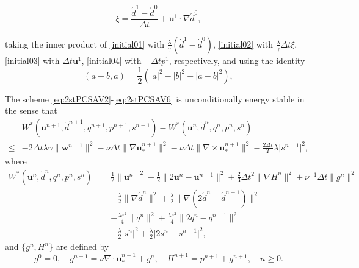 \documentclass[10pt,a4paper]{amsart}
\newcommand{\dd}{\ensuremath{\acute d}}
\newcommand{\uu}{\mathrm{\textbf{u}}}
\newcommand{\ww}{\mathrm{\textbf{w}}}
\begin{document}
\begin{equation}\label{initial02}
\xi=\frac{\dd^{1}-\dd^{0}}{\Delta t}+ \uu^{1}\cdot \nabla \dd^{0},
\end{equation}

taking the inner product of \eqref{initial01} with $\frac{\lambda}{\gamma}(\dd^{1}-\dd^0)$, \eqref{initial02} with $\frac{\lambda}{\gamma}\Delta t\xi$, \eqref{initial03} with $\Delta t\uu^1$, \eqref{initial04} with $-\Delta t p^1$, respectively, and using the identity \begin{equation}\label{a-ba}
(a-b,a)=\frac{1}{2}\left(|a|^2-|b|^2+|a-b|^2\right),
\end{equation} 

\begin{theorem}\label{pcsavthm}
The scheme \eqref{eq:2stPCSAV2}-\eqref{eq:2stPCSAV6} is unconditionally energy stable in the sense that
\begin{equation}\label{2stenergy}
\begin{aligned}
&W^*\left(\uu^{n+1},\dd^{n+1},q^{n+1},p^{n+1},s^{n+1}\right)-W^*\left(\uu^{n},\dd^{n},q^{n},p^{n},s^{n}\right)\\
\leq &-2\Delta t\lambda\gamma\lVert \ww^{n+1}\rVert^2-\nu\Delta t\lVert \nabla\uu_*^{n+1}\rVert^2
-\nu\Delta t \lVert \nabla\times\uu_*^{n+1}\rVert^2
-\frac{2\Delta t}{T}\lambda\lvert s^{n+1}\rvert^2,
\end{aligned}
\end{equation}
where
\begin{align*}
W^*\left(\uu^{n},\dd^{n},q^{n},p^{n},s^{n}\right)=&\frac{1}{2}\lVert\uu^{n}\rVert^2+\frac{1}{2}\lVert2\uu^{n}-\uu^{n-1}\rVert^2+\frac{2}{3}\Delta t^2\lVert\nabla H^{n}\rVert^2
+\nu^{-1}\Delta t\lVert g^{n}\rVert^2\\
&+\frac{\lambda}{2}\lVert\nabla\dd^{n}\rVert^2
+\frac{\lambda}{2}\lVert\nabla\left(2\dd^{n}-\dd^{n-1}\right)\rVert^2\\
&+\frac{\lambda\varepsilon^2}{4}\lVert q^{n}\rVert^2
+\frac{\lambda\varepsilon^2}{4}\lVert 2q^{n}-q^{n-1}\rVert^2\\
&+\frac{\lambda}{2}\lvert s^{n}\rvert^2
+\frac{\lambda}{2}\lvert 2s^{n}-s^{n-1}\rvert^2,
\end{align*}
and $\{g^n,H^n\}$ are defined by
\begin{equation}\label{gh-eq}
g^0=0,\quad g^{n+1}=\nu\nabla\cdot\uu_*^{n+1}+g^n,\quad H^{n+1}=p^{n+1}+g^{n+1},\quad n\ge 0.
\end{equation}
\end{theorem}
\end{document}
